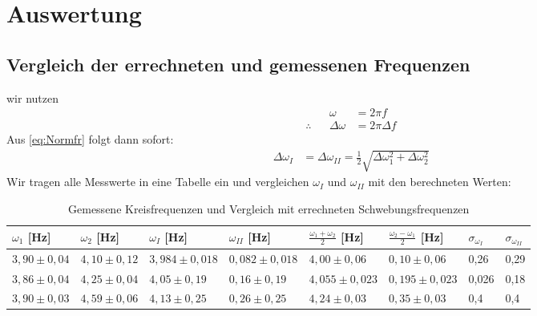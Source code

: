\section{Auswertung}
\subsection{Vergleich der errechneten und gemessenen Frequenzen}
wir nutzen 
\begin{align}
	&& \omega &= 2\pi f\\
	\therefore &&\Delta \omega &= 2\pi \Delta f
\end{align}
Aus \eqref{eq:Normfr} folgt dann sofort:
\begin{align}
	\Delta \omega_{I} &= \Delta \omega_{II}=\frac12 \sqrt{\Delta \omega_1^2+\Delta \omega_2 ^2}
\end{align}
Wir tragen alle Messwerte in eine Tabelle ein und vergleichen $\omega_I$ und $\omega_{II}$ mit den berechneten Werten:
\begin{table}[H]
	\centering
	\begin{tabular}{llllllll}
			$\omega_1$ [Hz] & $\omega_2$ [Hz] & $\omega_I$ [Hz] & $\omega_{II}$ [Hz] & $\frac{\omega_1+\omega_2}{2}$ [Hz] & $\frac{\omega_2-\omega_1}{2}$ [Hz] & $\sigma_{\omega_I}$ & $\sigma_{\omega_{II}}$\\
			\hline
			$3,90 \pm 0,04$ & $4,10 \pm 0,12$ & $3,984 \pm 0,018$ & $0,082 \pm 0,018$  & $4,00\pm 0,06$ & $0,10\pm 0,06$ & 0,26 & 0,29 \\
			$3,86 \pm 0,04$ & $4,25 \pm 0,04$ & $4,05 \pm 0,19$ & $0,16 \pm 0,19$  & $4,055\pm 0,023$ & $0,195\pm 0,023$ & 0,026 & 0,18 \\
			$3,90 \pm 0,03$ & $4,59 \pm 0,06$ & $4,13 \pm 0,25$ & $0,26 \pm 0,25$  & $4,24\pm 0,03$ & $0,35\pm 0,03$ & 0,4 & 0,4 \\
	\end{tabular}
	\caption{Gemessene Kreisfrequenzen und Vergleich mit errechneten Schwebungsfrequenzen}
	\label{tab:1}
\end{table}










